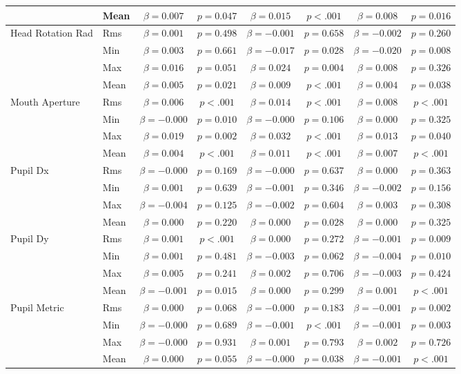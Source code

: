\begin{tabular}{llcc|cc|cc}
 & Mean & $\beta = 0.007$ & $p = 0.047$ & $\beta = 0.015$ & $p < .001$ & $\beta = 0.008$ & $p = 0.016$ \\
\midrule
\multirow{4}{*}{Head Rotation Rad} & Rms & $\beta = 0.001$ & $p = 0.498$ & $\beta = -0.001$ & $p = 0.658$ & $\beta = -0.002$ & $p = 0.260$ \\
 & Min & $\beta = 0.003$ & $p = 0.661$ & $\beta = -0.017$ & $p = 0.028$ & $\beta = -0.020$ & $p = 0.008$ \\
 & Max & $\beta = 0.016$ & $p = 0.051$ & $\beta = 0.024$ & $p = 0.004$ & $\beta = 0.008$ & $p = 0.326$ \\
 & Mean & $\beta = 0.005$ & $p = 0.021$ & $\beta = 0.009$ & $p < .001$ & $\beta = 0.004$ & $p = 0.038$ \\
\midrule
\multirow{4}{*}{Mouth Aperture} & Rms & $\beta = 0.006$ & $p < .001$ & $\beta = 0.014$ & $p < .001$ & $\beta = 0.008$ & $p < .001$ \\
 & Min & $\beta = -0.000$ & $p = 0.010$ & $\beta = -0.000$ & $p = 0.106$ & $\beta = 0.000$ & $p = 0.325$ \\
 & Max & $\beta = 0.019$ & $p = 0.002$ & $\beta = 0.032$ & $p < .001$ & $\beta = 0.013$ & $p = 0.040$ \\
 & Mean & $\beta = 0.004$ & $p < .001$ & $\beta = 0.011$ & $p < .001$ & $\beta = 0.007$ & $p < .001$ \\
\midrule
\multirow{4}{*}{Pupil Dx} & Rms & $\beta = -0.000$ & $p = 0.169$ & $\beta = -0.000$ & $p = 0.637$ & $\beta = 0.000$ & $p = 0.363$ \\
 & Min & $\beta = 0.001$ & $p = 0.639$ & $\beta = -0.001$ & $p = 0.346$ & $\beta = -0.002$ & $p = 0.156$ \\
 & Max & $\beta = -0.004$ & $p = 0.125$ & $\beta = -0.002$ & $p = 0.604$ & $\beta = 0.003$ & $p = 0.308$ \\
 & Mean & $\beta = 0.000$ & $p = 0.220$ & $\beta = 0.000$ & $p = 0.028$ & $\beta = 0.000$ & $p = 0.325$ \\
\midrule
\multirow{4}{*}{Pupil Dy} & Rms & $\beta = 0.001$ & $p < .001$ & $\beta = 0.000$ & $p = 0.272$ & $\beta = -0.001$ & $p = 0.009$ \\
 & Min & $\beta = 0.001$ & $p = 0.481$ & $\beta = -0.003$ & $p = 0.062$ & $\beta = -0.004$ & $p = 0.010$ \\
 & Max & $\beta = 0.005$ & $p = 0.241$ & $\beta = 0.002$ & $p = 0.706$ & $\beta = -0.003$ & $p = 0.424$ \\
 & Mean & $\beta = -0.001$ & $p = 0.015$ & $\beta = 0.000$ & $p = 0.299$ & $\beta = 0.001$ & $p < .001$ \\
\midrule
\multirow{4}{*}{Pupil Metric} & Rms & $\beta = 0.000$ & $p = 0.068$ & $\beta = -0.000$ & $p = 0.183$ & $\beta = -0.001$ & $p = 0.002$ \\
 & Min & $\beta = -0.000$ & $p = 0.689$ & $\beta = -0.001$ & $p < .001$ & $\beta = -0.001$ & $p = 0.003$ \\
 & Max & $\beta = -0.000$ & $p = 0.931$ & $\beta = 0.001$ & $p = 0.793$ & $\beta = 0.002$ & $p = 0.726$ \\
 & Mean & $\beta = 0.000$ & $p = 0.055$ & $\beta = -0.000$ & $p = 0.038$ & $\beta = -0.001$ & $p < .001$ \\
\midrule
\bottomrule
\end{tabular}